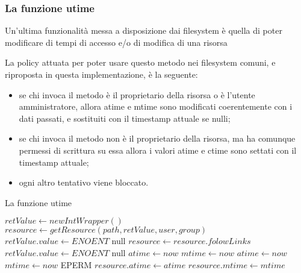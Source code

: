 \newpage

\subsubsection {La funzione utime}
Un'ultima funzionalità messa a disposizione dai filesystem è quella di poter modificare di tempi di accesso e/o di modifica di una risorsa

La policy attuata per poter usare questo metodo nei filesystem comuni, e riproposta in questa implementazione, è la seguente:
\begin{itemize}
\item se chi invoca il metodo è il proprietario della risorsa o è l'utente amministratore, allora atime e mtime sono modificati coerentemente con i dati passati, e sostituiti con il timestamp attuale se nulli;
\item se chi invoca il metodo non è il proprietario della risorsa, ma ha comunque permessi di scrittura su essa allora i valori atime e ctime sono settati con il timestamp attuale;
\item ogni altro tentativo viene bloccato.

\end{itemize}
\begin{algorithm}
\begin{algorithmic}[5]
\caption{La funzione utime}
	\State $retValue \gets new IntWrapper()$
	\State $resource \gets getResource(path, retValue, user, group)$
		\State $retValue.value \gets ENOENT$
		\State \Return null
	\EndIf
		\State $resource \gets resource.folowLinks$
	\EndIf
		\State $retValue.value \gets ENOENT$
		\State \Return null
	\EndIf
			\State $atime \gets now$
		\EndIf
			\State $mtime \gets now$
		\EndIf
		\State $atime \gets now$
		\State $mtime \gets now$
	\Else
		\State \Return EPERM
	\EndIf
	\State $resource.atime \gets atime$
	\State $resource.mtime \gets mtime$
	\State {}
\EndFunction
\end{algorithmic}
\end{algorithm}